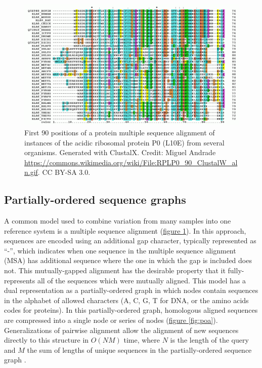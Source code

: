 \documentclass{article}
\begin{document}
\begin{figure}[h!]
\centering
\includegraphics[width=1.0\textwidth]{figures/RPLP0_90_ClustalW_aln}
\caption{\label{fig:msa}
  First 90 positions of a protein multiple sequence alignment of instances of the acidic ribosomal protein P0 (L10E) from several organisms. Generated with ClustalX. Credit: Miguel Andrade \url{https://commons.wikimedia.org/wiki/File:RPLP0_90_ClustalW_aln.gif}. CC BY-SA 3.0.
}
\end{figure}

\subsection{Partially-ordered sequence graphs}

A common model used to combine variation from many samples into one reference system is a multiple sequence alignment (\hyperref[fig:msa]{figure \ref{fig:msa}}). In this approach, sequences are encoded using an additional gap character, typically represented as ``-'', which indicates when one sequence in the multiple sequence alignment (MSA) has additional sequence where the one in which the gap is included does not. This mutually-gapped alignment has the desirable property that it fully-represents all of the sequences which were mutually aligned. This model has a dual representation as a partially-ordered graph in which nodes contain sequences in the alphabet of allowed characters (A, C, G, T for DNA, or the amino acids codes for proteins). In this partially-ordered graph, homologous aligned sequences are compressed into a single node or series of nodes (\hyperref[fig:poa]{figure \ref{fig:poa}}). Generalizations of pairwise alignment \cite{gotoh1982} allow the alignment of new sequences directly to this structure in $O(NM)$ time, where $N$ is the length of the query and $M$ the sum of lengths of unique sequences in the partially-ordered sequence graph \cite{lee2002POA}.
\end{document}
